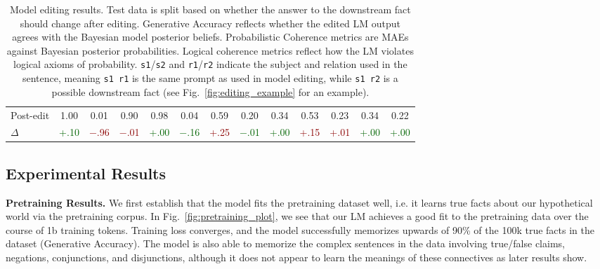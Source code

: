 \documentclass[11pt,a4paper]{article}
\begin{document}
\begin{table}
\begin{tabular}{lcccccccccccc}
 \hspace{2pt} Post-edit & 1.00 & 0.01 & 0.90 & 0.98 & 0.04 & 0.59 & 0.20 & 0.34 & 0.53 & 0.23 & 0.34 & 0.22 \\ 
 \hspace{14pt} $\Delta$ & \textcolor{darkgreen}{+.10} & \textcolor{darkred}{$-$.96}\hspace{1pt} & \textcolor{darkred}{$-$.01}\hspace{1pt} & \textcolor{darkgreen}{+.00} & \textcolor{darkgreen}{$-$.16}\hspace{1pt} & \textcolor{darkred}{+.25} & \textcolor{darkgreen}{$-$.01} & \textcolor{darkgreen}{+.00} & \textcolor{darkred}{+.15} & \textcolor{darkred}{+.01} & \textcolor{darkgreen}{+.00} & \textcolor{darkgreen}{+.00} \\
 \hline
\end{tabular}
\caption{Model editing results. Test data is split based on whether the answer to the downstream fact should change after editing. Generative Accuracy reflects whether the edited LM output agrees with the Bayesian model posterior beliefs. Probabilistic Coherence metrics are MAEs against Bayesian posterior probabilities. Logical coherence metrics reflect how the LM violates logical axioms of probability. \texttt{s1}/\texttt{s2} and \texttt{r1}/\texttt{r2} indicate the subject and relation used in the sentence, meaning \texttt{s1 \hspace{-7pt} r1} is the same prompt as used in model editing, while \texttt{s1 \hspace{-7pt} r2} is a possible downstream fact (see Fig.~\ref{fig:editing_example} for an example).}
\label{tab:main_table}
\end{table}

\subsection{Experimental Results}

\vspace{4pt}
\noindent \textbf{Pretraining Results.} 
We first establish that the model fits the pretraining dataset well, i.e. it learns true facts about our hypothetical world via the pretraining corpus. In Fig.~\ref{fig:pretraining_plot}, we see that our LM achieves a good fit to the pretraining data over the course of 1b training tokens. Training loss converges, and the model successfully memorizes upwards of 90\% of the 100k true facts in the dataset (Generative Accuracy).
The model is also able to memorize the complex sentences in the data involving true/false claims, negations, conjunctions, and disjunctions, although it does not appear to learn the meanings of these connectives as later results show. 
\end{document}
